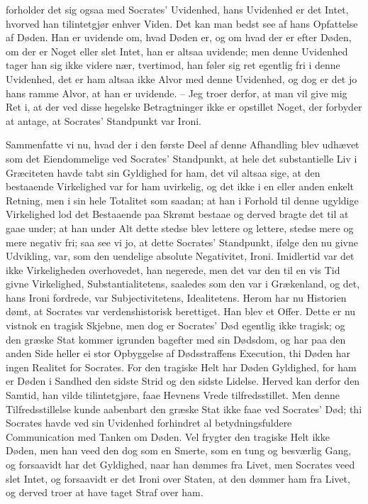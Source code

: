 \documentclass[12pt,a4paper]{article}
\begin{document}
forholder det sig ogsaa med Socrates' Uvidenhed, hans Uvidenhed er det Intet, hvorved han tilintetgjør enhver Viden. Det kan man bedst see af hans Opfattelse af Døden. Han er uvidende om, hvad Døden er, og om hvad der er efter Døden, om der er Noget eller slet Intet, han er altsaa uvidende; men denne Uvidenhed tager han sig ikke videre nær, tvertimod, han føler sig ret egentlig fri i denne Uvidenhed, det er ham altsaa ikke Alvor med denne Uvidenhed, og dog er det jo hans ramme Alvor, at han er uvidende. – Jeg troer derfor, at man vil give mig Ret i, at der ved disse hegelske Betragtninger ikke er opstillet Noget, der forbyder at antage, at Socrates' Standpunkt var Ironi.

Sammenfatte vi nu, hvad der i den første Deel af denne Afhandling blev udhævet som det Eiendommelige ved Socrates' Standpunkt, at hele det substantielle Liv i Græciteten havde tabt sin Gyldighed for ham, det vil altsaa sige, at den bestaaende Virkelighed var for ham uvirkelig, og det ikke i en eller anden enkelt Retning, men i sin hele Totalitet som saadan; at han i Forhold til denne ugyldige Virkelighed lod det Bestaaende paa Skrømt bestaae og derved bragte det til at gaae under; at han under Alt dette stedse blev lettere og lettere, stedse mere og mere negativ fri; saa see vi jo, at dette Socrates' Standpunkt, ifølge den nu givne Udvikling, var, som den uendelige absolute Negativitet, Ironi. Imidlertid var det ikke Virkeligheden overhovedet, han negerede, men det var den til en vis Tid givne Virkelighed, Substantialitetens, saaledes som den var i Grækenland, og det, hans Ironi fordrede, var Subjectivitetens, Idealitetens. Herom har nu Historien dømt, at Socrates var verdenshistorisk berettiget. Han blev et Offer. Dette er nu vistnok en tragisk Skjebne, men dog er Socrates' Død egentlig ikke tragisk; og den græske Stat kommer igrunden bagefter med sin Dødsdom, og har paa den anden Side heller ei stor Opbyggelse af Dødsstraffens Execution, thi Døden har ingen Realitet for Socrates. For den tragiske Helt har Døden Gyldighed, for ham er Døden i Sandhed den sidste Strid og den sidste Lidelse. Herved kan derfor den Samtid, han vilde tilintetgjøre, faae Hevnens Vrede tilfredsstillet. Men denne Tilfredsstillelse kunde aabenbart den græske Stat ikke faae ved Socrates' Død; thi Socrates havde ved sin Uvidenhed forhindret al betydningsfuldere Communication med Tanken om Døden. Vel frygter den tragiske Helt ikke Døden, men han veed den dog som en Smerte, som en tung og besværlig Gang, og forsaavidt har det Gyldighed, naar han dømmes fra Livet, men Socrates veed slet Intet, og forsaavidt er det Ironi over Staten, at den dømmer ham fra Livet, og derved troer at have taget Straf over ham.
\end{document}
